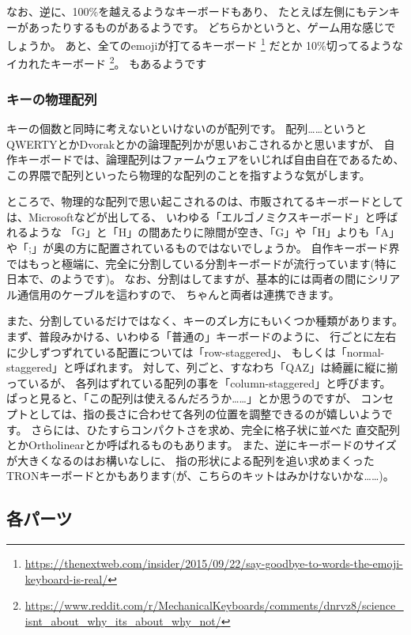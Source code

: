 \documentclass[mingoth,a4paper]{jsarticle}
\begin{document}
なお、逆に、100\%を越えるようなキーボードもあり、
たとえば左側にもテンキーがあったりするものがあるようです。
どちらかというと、ゲーム用な感じでしょうか。
あと、全てのemojiが打てるキーボード%
\footnote{\url{https://thenextweb.com/insider/2015/09/22/say-goodbye-to-words-the-emoji-keyboard-is-real/}}
だとか
10\%切ってるようなイカれたキーボード%
\footnote{\url{https://www.reddit.com/r/MechanicalKeyboards/comments/dnrvz8/science_isnt_about_why_its_about_why_not/}}。
もあるようです

\subsubsection*{キーの物理配列}

キーの個数と同時に考えないといけないのが配列です。
配列……というとQWERTYとかDvorakとかの論理配列かが思いおこされるかと思いますが、
自作キーボードでは、論理配列はファームウェアをいじれば自由自在であるため、
この界隈で配列といったら物理的な配列のことを指すような気がします。

ところで、物理的な配列で思い起こされるのは、市販されてるキーボードとしては、Microsoftなどが出してる、
いわゆる「エルゴノミクスキーボード」と呼ばれるような
「G」と「H」の間あたりに隙間が空き、「G」や「H」よりも「A」や「;」が奥の方に配置されているものではないでしょうか。
自作キーボード界ではもっと極端に、完全に分割している分割キーボードが流行っています(特に日本で、のようです)。
なお、分割はしてますが、基本的には両者の間にシリアル通信用のケーブルを這わすので、
ちゃんと両者は連携できます。

また、分割しているだけではなく、キーのズレ方にもいくつか種類があります。
まず、普段みかける、いわゆる「普通の」キーボードのように、
行ごとに左右に少しずつずれている配置については「row-staggered」、
もしくは「normal-staggered」と呼ばれます。
対して、列ごと、すなわち「QAZ」は綺麗に縦に揃っているが、
各列はずれている配列の事を「column-staggered」と呼びます。
ぱっと見ると、「この配列は使えるんだろうか……」とか思うのですが、
コンセプトとしては、指の長さに合わせて各列の位置を調整できるのが嬉しいようです。
さらには、ひたすらコンパクトさを求め、完全に格子状に並べた
直交配列とかOrtholinearとか呼ばれるものもあります。
また、逆にキーボードのサイズが大きくなるのはお構いなしに、
指の形状による配列を追い求めまくったTRONキーボードとかもあります(が、こちらのキットはみかけないかな……)。

\subsection{各パーツ}
\end{document}
